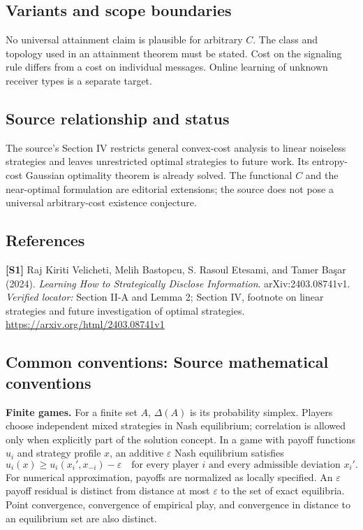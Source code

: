 \documentclass[11pt,a4paper]{article}
\begin{document}
\subsection*{Variants and scope boundaries}
No universal attainment claim is plausible for arbitrary $C$. The class and topology used in an attainment theorem must be stated. Cost on the signaling rule differs from a cost on individual messages. Online learning of unknown receiver types is a separate target.
\subsection*{Source relationship and status}
The source's Section IV restricts general convex-cost analysis to linear noiseless strategies and leaves unrestricted optimal strategies to future work. Its entropy-cost Gaussian optimality theorem is already solved. The functional $C$ and the near-optimal formulation are editorial extensions; the source does not pose a universal arbitrary-cost existence conjecture.
\subsection*{References}
\begingroup\footnotesize\raggedright
\textbf{[S1]} Raj Kiriti Velicheti, Melih Bastopcu, S. Rasoul Etesami, and Tamer Başar (2024). \emph{Learning How to Strategically Disclose Information}. arXiv:2403.08741v1. \textit{Verified locator:} Section II-A and Lemma 2; Section IV, footnote on linear strategies and future investigation of optimal strategies. \url{https://arxiv.org/html/2403.08741v1}
\par\endgroup

\subsection*{Common conventions: Source mathematical conventions}

\textbf{Finite games.} For a finite set $A$, $\Delta(A)$ is its probability
simplex. Players choose independent mixed strategies in Nash equilibrium;
correlation is allowed only when explicitly part of the solution concept.
In a game with payoff functions $u_i$ and strategy profile $x$, an additive
$\varepsilon$ Nash equilibrium satisfies
\[
 u_i(x)\geq u_i(x_i',x_{-i})-\varepsilon
 \quad\text{for every player $i$ and every admissible deviation $x_i'$}.
\]
For numerical approximation, payoffs are normalized as locally specified.
An $\varepsilon$ payoff residual is distinct from distance at most
$\varepsilon$ to the set of exact equilibria. Point convergence, convergence
of empirical play, and convergence in distance to an equilibrium set are
also distinct.
\end{document}
